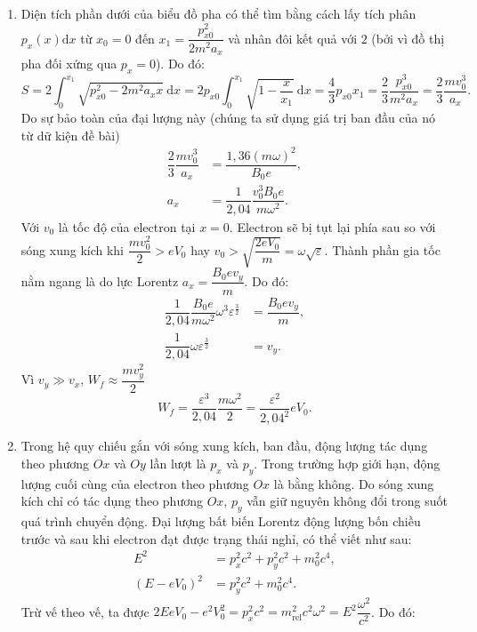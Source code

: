 \begin{loigiai}
\begin{enumerate}[1)]
\begin{center}
    \end{center}
    \item Diện tích phần dưới của biểu đồ pha có thể tìm bằng cách lấy tích phân $p_{x}(x)\mathrm{d}x$ từ $x_0=0$ đến $x_1=\dfrac{p^2_{x0}}{2m^2a_{x}}$ và nhân đôi kết quả với $2$ (bởi vì đồ thị pha đối xứng qua $p_{x}=0$). Do đó:
    \[S=2\int_{0}^{x_1}\sqrt{p^2_{x0}-2m^2a_{x}x}~\mathrm{d}x=2p_{x0}\int_{0}^{x_1}\sqrt{1-\dfrac{x}{x_1}}~\mathrm{d}x=\dfrac{4}{3}p_{x0}x_1=\dfrac{2}{3}\dfrac{p^3_{x0}}{m^2a_{x}}=\dfrac{2}{3}\dfrac{mv_0^3}{a_{x}}.\]
    Do sự bảo toàn của đại lượng này (chúng ta sử dụng giá trị ban đầu của nó từ dữ kiện đề bài)
    \begin{align*}
    \dfrac{2}{3}\dfrac{mv_0^3}{a_{x}}&=\dfrac{1,36(m\omega)^2}{B_0e},\\
    a_{x}&=\dfrac{1}{2,04}\dfrac{v_0^3B_0e}{m\omega^2}.
    \end{align*}
    Với $v_0$ là tốc độ của electron tại $x=0$. Electron sẽ bị tụt lại phía sau so với sóng xung kích khi $\dfrac{mv_0^2}{2}>eV_0$ hay $v_0>\sqrt{\dfrac{2eV_0}{m}}=\omega\sqrt{\varepsilon}$. Thành phần gia tốc nằm ngang là do lực Lorentz $a_{x}=\dfrac{B_0ev_{y}}{m}$. Do đó:
    \begin{align*}
        \dfrac{1}{2,04}\dfrac{B_0e}{m\omega^2}\omega^3\varepsilon^{ \frac{3}{2}}&=\dfrac{B_0ev_{y}}{m},\\
        \dfrac{1}{2,04}\omega\varepsilon^{ \frac{3}{2}}&=v_{y}.
    \end{align*}
    Vì $v_{y} \gg v_{x}$, $W_{f}\approx\dfrac{mv^2_{y}}{2}$
    \[W_{f}=\dfrac{\varepsilon^3}{2,04}\dfrac{m\omega^2}{2}=\dfrac{\varepsilon^2}{2,04^2}eV_0.\]
    \item Trong hệ quy chiếu gắn với sóng xung kích, ban đầu, động lượng tác dụng theo phương $Ox$ và $Oy$ lần lượt là $p_{x}$ và $p_{y}$. Trong trường hợp giới hạn, động lượng cuối cùng của electron theo phương $Ox$ là bằng không. Do sóng xung kích chỉ có tác dụng theo phương $Ox$, $p_{y}$ vẫn giữ nguyên không đổi trong suốt quá trình chuyển động. Đại lượng bất biến Lorentz động lượng bốn chiều trước và sau khi electron đạt được trạng thái nghỉ, có thể viết như sau:
    \begin{align*}
        E^2&=p_{x}^2c^2+p_{y}^2c^2+m_0^2c^4,\\
        (E-eV_0)^2&=p_{y}^2c^2+m_0^2c^4.
    \end{align*}
Trừ vế theo vế, ta được $2EeV_0-e^2V_0^2=p_{x}^2c^2=m^2_{\text{rel}}c^2\omega^2=E^2\dfrac{\omega^2}{c^2}$. Do đó:
\[\begin{aligned}

\end{aligned}\]
\end{enumerate}
\end{loigiai}
